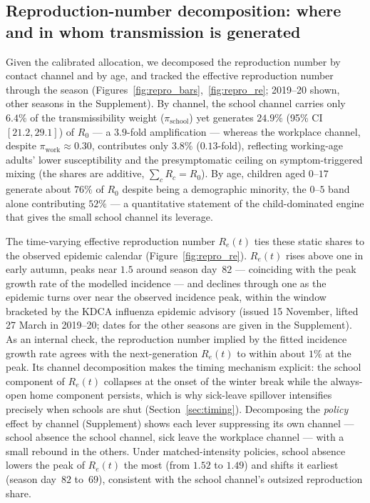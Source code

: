 \documentclass[12pt]{article}
\theoremstyle{plain}
\theoremstyle{remark}
\theoremstyle{definition}
\begin{document}
\subsection{Reproduction-number decomposition: where and in whom transmission is generated}
\label{sec:repro}
Given the calibrated allocation, we decomposed the reproduction number by contact channel and by age, and tracked the effective reproduction number through the season (Figures~\ref{fig:repro_bars},~\ref{fig:repro_re}; 2019--20 shown, other seasons in the Supplement). By channel, the school channel carries only $6.4\%$ of the transmissibility weight ($\pi_{\mathrm{school}}$) yet generates $24.9\%$ (95\% CI $[21.2, 29.1]$) of $R_0$ --- a $3.9$-fold amplification --- whereas the workplace channel, despite $\pi_{\mathrm{work}} \approx 0.30$, contributes only $3.8\%$ ($0.13$-fold), reflecting working-age adults' lower susceptibility and the presymptomatic ceiling on symptom-triggered mixing (the shares are additive, $\sum_c R_c = R_0$). By age, children aged $0$--$17$ generate about $76\%$ of $R_0$ despite being a demographic minority, the $0$--$5$ band alone contributing $52\%$ --- a quantitative statement of the child-dominated engine that gives the small school channel its leverage.

The time-varying effective reproduction number $R_e(t)$ ties these static shares to the observed epidemic calendar (Figure~\ref{fig:repro_re}). $R_e(t)$ rises above one in early autumn, peaks near $1.5$ around season day~$82$ --- coinciding with the peak growth rate of the modelled incidence --- and declines through one as the epidemic turns over near the observed incidence peak, within the window bracketed by the KDCA influenza epidemic advisory (issued 15 November, lifted 27 March in 2019--20; dates for the other seasons are given in the Supplement). As an internal check, the reproduction number implied by the fitted incidence growth rate agrees with the next-generation $R_e(t)$ to within about $1\%$ at the peak. Its channel decomposition makes the timing mechanism explicit: the school component of $R_e(t)$ collapses at the onset of the winter break while the always-open home component persists, which is why sick-leave spillover intensifies precisely when schools are shut (Section~\ref{sec:timing}). Decomposing the \emph{policy} effect by channel (Supplement) shows each lever suppressing its own channel --- school absence the school channel, sick leave the workplace channel --- with a small rebound in the others. Under matched-intensity policies, school absence lowers the peak of $R_e(t)$ the most (from $1.52$ to $1.49$) and shifts it earliest (season day~$82$ to~$69$), consistent with the school channel's outsized reproduction share.
\end{document}
